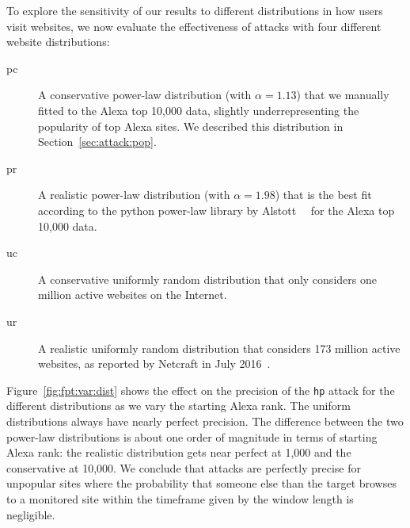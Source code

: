 To explore the sensitivity of our results to different distributions in
how users visit websites, we now evaluate the effectiveness of \name
attacks with four different website distributions:
\begin{description}
	\item[pc] A conservative power-law distribution
	(with $\alpha=1.13$)
	that we manually fitted to the Alexa top 10,000 data,
	slightly underrepresenting the popularity of top Alexa sites.
	We described this distribution in Section~\ref{sec:attack:pop}.
	\item[pr] A realistic power-law distribution
	(with $\alpha=1.98$)
	that is the best fit according to
	the python power-law library by Alstott~\ea~\cite{power-law} for the Alexa
	top 10,000 data.
	\item[uc] A conservative uniformly random distribution that
	only considers one million active websites on the Internet.
	\item[ur] A realistic uniformly random distribution that
          considers 173 million active websites, as reported by Netcraft
          in July 2016~\cite{numberofwebsites}.
\end{description}
Figure~\ref{fig:fpt:var:dist} shows the effect on the precision of the
\texttt{hp} attack for the different distributions as we vary the starting
Alexa rank. The uniform distributions always have nearly perfect precision.
The difference between the two power-law distributions is about one order of
magnitude in terms of starting Alexa rank: the realistic distribution gets
near perfect at 1,000 and the conservative at 10,000.
We conclude that \name attacks are perfectly precise for unpopular sites
where the probability that someone else than the target browses to a monitored
site within the timeframe given by the window length is negligible.
